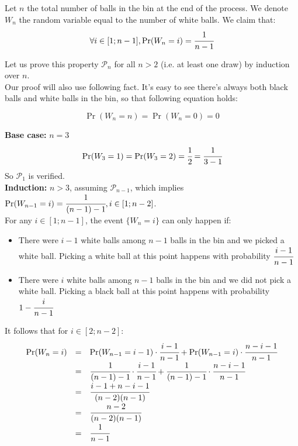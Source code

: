 \providecommand{\f}[2]{\ensuremath{\cfrac{#1}{#2}}}

Let $n$ the total number of balls in the bin at the end of the process. We denote $W_n$ the random variable equal to the number of white balls. We claim that:
\[
  \forall i \in [1; n-1], \Pr(W_n = i) = \f{1}{n - 1}
\]

Let us prove this property $\mathcal{P}_n$ for all $n > 2$ (i.e. at least one draw) by induction over $n$.\\

Our proof will also use following fact. It's easy to see there's always both black balls and white balls in the bin, so that following equation holds:

\[
  \Pr(W_n = n) = \Pr(W_n = 0) = 0
\]

\noindent
\textbf{Base case:} $n = 3$\\
\[
    \Pr(W_3 = 1) = \Pr(W_3 = 2) = \f{1}{2} = \f{1}{3 - 1}
\]
So $\mathcal{P}_1$ is verified.\\

\noindent
\textbf{Induction:} $n > 3$, assuming $\mathcal{P}_{n-1}$, which implies $\Pr(W_{n-1} = i) = \f{1}{(n - 1) - 1}, i \in [1;n - 2]$.\\
For any $i \in [1; n-1]$, the event $\{W_n = i\}$ can only happen if:
\begin{itemize}
  \item There were $i - 1$ white balls among $n - 1$ balls in the bin and we picked a white ball. Picking a white ball at this point happens with probability $\f{i - 1}{n - 1}$
  \item There were $i$ white balls among $n - 1$ balls in the bin and we did not pick a white ball. Picking a black ball at this point happens with probability $1 - \f{i}{n - 1}$
\end{itemize}

\noindent
It follows that for $i \in [2; n - 2]$:
\[\def\arraystretch{1.5}
  \begin{array}{lll}
    \Pr(W_n = i) & = & \Pr(W_{n-1} = i - 1) \cdot \f{i - 1}{n - 1} + \Pr(W_{n-1} = i) \cdot \f{n - i - 1}{n - 1} \\
                 & = & \f{1}{(n - 1) - 1} \cdot \f{i - 1}{n - 1} + \f{1}{(n - 1) - 1} \cdot \f{n - i - 1}{n - 1} \\
                 & = & \f{i - 1 + n - i - 1}{(n - 2)(n-1)} \\
                 & = & \f{n - 2}{(n - 2)(n-1)}\\
                 & = & \f{1}{n - 1}
  \end{array}
\]

